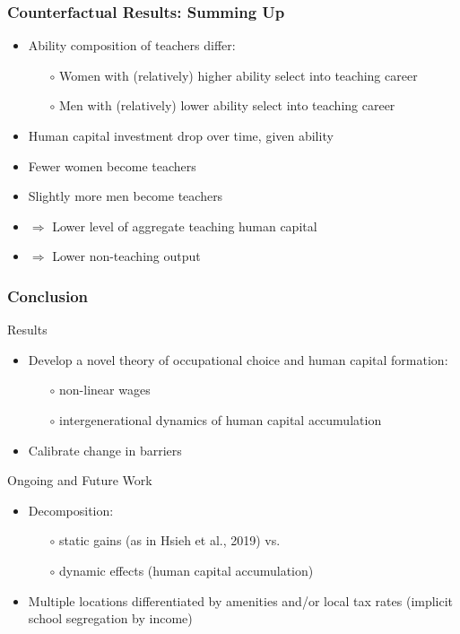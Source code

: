 \documentclass[11pt]{beamer}
\begin{document}
\begin{frame}
\frametitle{Counterfactual Results: Summing Up}
\begin{itemize}
    \item Ability composition of teachers differ:
    \begin{itemize}
				\item[$\circ$] Women with (relatively) higher ability select into teaching career %
                \item[$\circ$] Men with (relatively) lower ability select into teaching career %
    \end{itemize}
    \item Human capital investment drop over time, given ability %
    \item Fewer women become teachers
    \item Slightly more men become teachers
    \item $\Rightarrow$ Lower level of aggregate teaching human capital 
    \item $\Rightarrow$ Lower non-teaching output 
\end{itemize}
\end{frame}


\begin{frame}
	\frametitle{Conclusion}
	\textcolor{tblue}{Results}
	\begin{itemize}
		\item Develop a novel theory of occupational choice and human capital formation: 
		\begin{itemize}
			\item[$\circ$] non-linear wages %
			\item[$\circ$] intergenerational dynamics of human capital accumulation
		\end{itemize}
		\item Calibrate change in barriers
	\end{itemize}
	\textcolor{tblue}{Ongoing and Future Work}
	\begin{itemize}	
        \item Decomposition:
            \begin{itemize}
			\item[$\circ$] static gains (as in Hsieh et al., 2019) vs.
			\item[$\circ$] dynamic effects (human capital accumulation)
		\end{itemize}
		\item Multiple locations differentiated by amenities and/or local tax rates (implicit school segregation by income)
	\end{itemize}
\end{frame}
\end{document}
